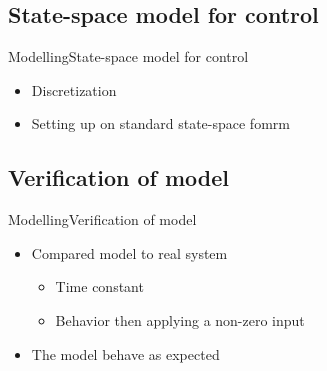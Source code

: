 \subsection{State-space model for control}

\begin{frame}{Modelling}{State-space model for control}
\begin{itemize}
	\item<1-> Discretization 
	\item<1-> Setting up on standard state-space fomrm
\end{itemize}
\end{frame}

\subsection{Verification of model}

\begin{frame}{Modelling}{Verification of model}
\begin{itemize}
	\item<1-> Compared model to real system
	\begin{itemize}
		\item<1-> Time constant 
		\item<1-> Behavior then applying a non-zero input
	\end{itemize}
\end{itemize}
\begin{itemize}
	\item<1-> The model behave as expected
\end{itemize}

\begin{figure}[H]
   \centering
    
\end{figure}

\end{frame}




